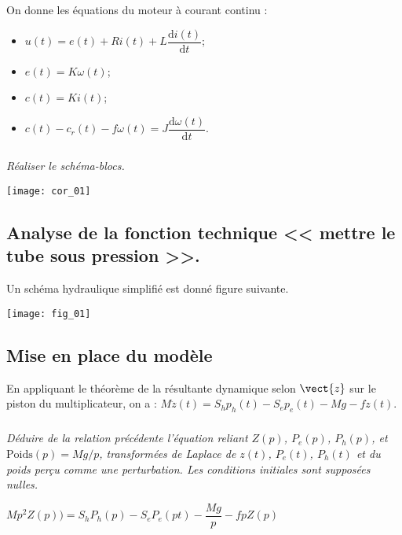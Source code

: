 \setcounter{exo}{0}

On donne les équations du moteur à courant continu :
\begin{itemize}
\item $u(t) = e(t)+ Ri(t) +L \dfrac{\text{d}i(t)}{\text{d} t}$;
\item $e(t)=K\omega(t)$;
\item $c(t)=Ki(t)$;
\item $c(t)-c_r(t) - f\omega(t)=J\dfrac{\text{d}\omega(t)}{\text{d} t}$.
\end{itemize}
\subparagraph{}
\textit{Réaliser le schéma-blocs.}

\ifprof
\begin{corrige}
\begin{center}
\texttt{[image: cor\_01]}
\end{center}
\end{corrige}
\else
\fi

\subsection*{Analyse de la fonction technique << mettre le tube sous pression >>.}


\ifprof
\else
Un schéma hydraulique simplifié est donné figure suivante.
\begin{center}
\texttt{[image: fig\_01]}

\end{center}
\fi

\subsection*{Mise en place du modèle}

En appliquant le théorème de la résultante dynamique selon $\vect{z}$ sur le piston du multiplicateur, on a : 
$
M\ddot{z}(t)=S_hp_h(t)-S_ep_e(t)-Mg-f\dot{z}(t).
$
\subparagraph{}
\textit{Déduire de la relation précédente l’équation reliant $Z(p)$, $P_e(p)$, $P_h(p)$, et $\text{Poids}(p)=Mg/p$, transformées de Laplace de $z(t)$, $P_e(t)$, $P_h(t)$ et du poids perçu comme une perturbation. Les conditions initiales sont supposées nulles.}
\ifprof
\begin{corrige}
$Mp^2 Z(p))=S_hP_h(p)-S_eP_e(pt)-\dfrac{Mg}{p}-fpZ(p)$
\end{corrige}
\else
\fi




